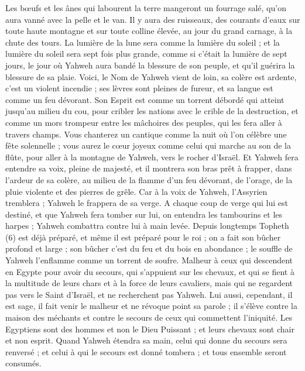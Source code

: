 \begin{multicols}{2}
{Les bœufs et les ânes qui labourent la terre mangeront un fourrage salé, qu’on aura vanné avec la pelle et le van.
Il y aura des ruisseaux, des courants d’eaux sur toute haute montagne et sur toute colline élevée, au jour du grand carnage, à la chute des tours.
La lumière de la lune sera comme la lumière du soleil ; et la lumière du soleil sera sept fois plus grande, comme si c'était la lumière de sept jours, le jour où Yahweh aura bandé la blessure de son peuple, et qu'il guérira la blessure de sa plaie.
Voici, le Nom de Yahweh vient de loin, sa colère est ardente, c’est un violent incendie ; ses lèvres sont pleines de fureur, et sa langue est comme un feu dévorant.
Son Esprit est comme un torrent débordé qui atteint jusqu’au milieu du cou, pour cribler les nations avec le crible de la destruction, et comme un mors trompeur entre les mâchoires des peuples, qui les fera aller à travers champs.
Vous chanterez un cantique comme la nuit où l’on célèbre une fête solennelle ; vous aurez le cœur joyeux comme celui qui marche au son de la flûte, pour aller à la montagne de Yahweh, vers le rocher d'Israël.
Et Yahweh fera entendre sa voix, pleine de majesté, et il montrera son bras prêt à frapper, dans l’ardeur de sa colère, au milieu de la flamme d’un feu dévorant, de l’orage, de la pluie violente et des pierres de grêle.
Car à la voix de Yahweh, l'Assyrien tremblera ; Yahweh le frappera de sa verge.
A chaque coup de verge qui lui est destiné, et que Yahweh fera tomber sur lui, on entendra les tambourins et les harpes ; Yahweh combattra contre lui à main levée.
Depuis longtemps Topheth (6) est déjà préparé, et même il est préparé pour le roi ; on a fait son bûcher profond et large ; son bûcher c'est du feu et du bois en abondance ; le souffle de Yahweh l’enflamme comme un torrent de soufre.
\VerseOne{}Malheur à ceux qui descendent en Egypte pour avoir du secours, qui s'appuient sur les chevaux, et qui se fient à la multitude de leurs chars et à la force de leurs cavaliers, mais qui ne regardent pas vers le Saint d'Israël, et ne recherchent pas Yahweh.
Lui aussi, cependant, il est sage, il fait venir le malheur et ne révoque point sa parole ; il s'élève contre la maison des méchants et contre le secours de ceux qui commettent l’iniquité.
Les Egyptiens sont des hommes et non le Dieu Puissant ; et leurs chevaux sont chair et non esprit. Quand Yahweh étendra sa main, celui qui donne du secours sera renversé ; et celui à qui le secours est donné tombera ; et tous ensemble seront consumés.
}
\end{multicols}
